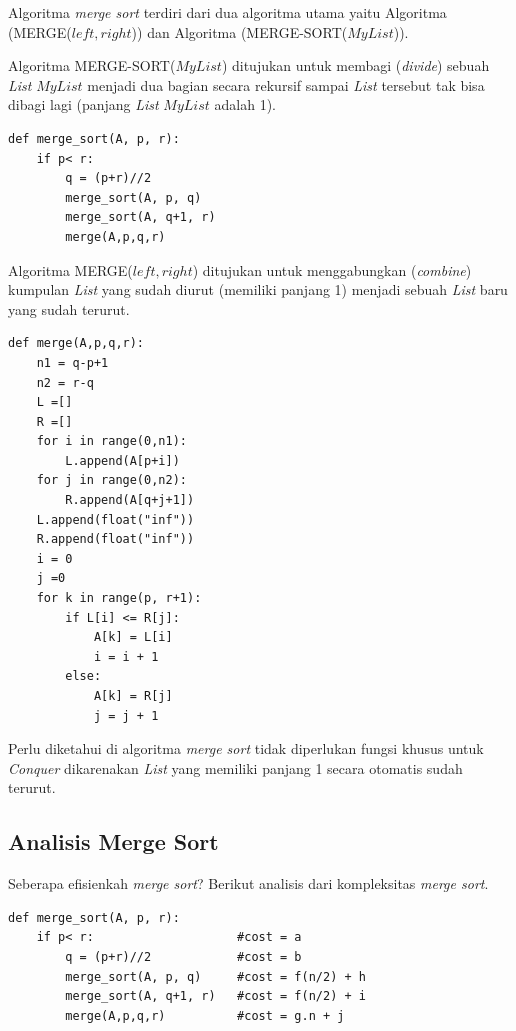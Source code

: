 Algoritma \textit{merge sort} terdiri dari dua algoritma utama yaitu Algoritma (MERGE($left,right$)) dan Algoritma (MERGE-SORT($MyList$)). 

Algoritma MERGE-SORT($MyList$) ditujukan untuk membagi (\textit{divide}) sebuah \textit{List} $MyList$ menjadi dua bagian secara rekursif sampai \textit{List} tersebut tak bisa dibagi lagi (panjang \textit{List} $MyList$ adalah 1). 

\lstset{language=Python}
\label{lst:MargeSort}
\begin{lstlisting}[frame=single]
def merge_sort(A, p, r):
    if p< r:
        q = (p+r)//2
        merge_sort(A, p, q)
        merge_sort(A, q+1, r)
        merge(A,p,q,r)
\end{lstlisting}

Algoritma MERGE($left,right$) ditujukan untuk menggabungkan (\textit{combine}) kumpulan \textit{List} yang sudah diurut (memiliki panjang 1) menjadi sebuah \textit{List} baru yang sudah terurut.

\lstset{language=Python}
\label{lst:Marge}
\begin{lstlisting}[frame=single]
def merge(A,p,q,r):
    n1 = q-p+1
    n2 = r-q
    L =[]
    R =[]
    for i in range(0,n1):
        L.append(A[p+i])
    for j in range(0,n2):
        R.append(A[q+j+1])
    L.append(float("inf"))
    R.append(float("inf"))
    i = 0
    j =0
    for k in range(p, r+1):
        if L[i] <= R[j]:
            A[k] = L[i]
            i = i + 1
        else:
            A[k] = R[j]
            j = j + 1

\end{lstlisting}

Perlu diketahui di algoritma \textit{merge sort} tidak diperlukan fungsi khusus untuk \textit{Conquer} dikarenakan \textit{List} yang memiliki panjang 1 secara otomatis sudah terurut.

\newpage{}
\subsection{Analisis Merge Sort}
Seberapa efisienkah \textit{merge sort}? Berikut analisis dari kompleksitas \textit{merge sort}.

\lstset{language=Python}
\label{lst:MargeSort}
\begin{lstlisting}[frame=single]
def merge_sort(A, p, r):
    if p< r:                    #cost = a
        q = (p+r)//2            #cost = b
        merge_sort(A, p, q)     #cost = f(n/2) + h
        merge_sort(A, q+1, r)   #cost = f(n/2) + i
        merge(A,p,q,r)          #cost = g.n + j
\end{lstlisting}

